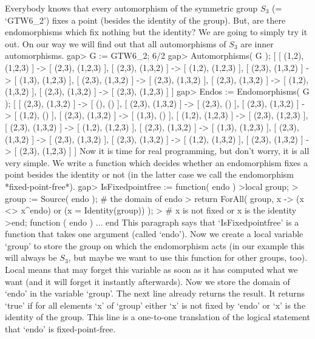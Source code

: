         Everybody knows that every automorphism of the symmetric group $S_3$
        (= `GTW6_2') fixes a point (besides the identity of the group). But,
        are there endomorphisms which fix nothing but the identity? We are
        going to simply try it out. On our way we will find out that all
        automorphisms of $S_3$ are inner automorphisms.
\beginexample
    gap> G := GTW6_2;
    6/2
    gap> Automorphisms( G );
    [ [ (1,2), (1,2,3) ] -> [ (2,3), (1,2,3) ], 
      [ (2,3), (1,3,2) ] -> [ (1,2), (1,2,3) ], 
      [ (2,3), (1,3,2) ] -> [ (1,3), (1,2,3) ], 
      [ (2,3), (1,3,2) ] -> [ (2,3), (1,3,2) ], 
      [ (2,3), (1,3,2) ] -> [ (1,2), (1,3,2) ], 
      [ (2,3), (1,3,2) ] -> [ (2,3), (1,2,3) ] ]
    gap> Endos := Endomorphisms( G );
    [ [ (2,3), (1,3,2) ] -> [ (), () ], [ (2,3), (1,3,2) ] -> [ (2,3), () ],
      [ (2,3), (1,3,2) ] -> [ (1,2), () ], 
      [ (2,3), (1,3,2) ] -> [ (1,3), () ], 
      [ (1,2), (1,2,3) ] -> [ (2,3), (1,2,3) ], 
      [ (2,3), (1,3,2) ] -> [ (1,2), (1,2,3) ], 
      [ (2,3), (1,3,2) ] -> [ (1,3), (1,2,3) ], 
      [ (2,3), (1,3,2) ] -> [ (2,3), (1,3,2) ], 
      [ (2,3), (1,3,2) ] -> [ (1,2), (1,3,2) ], 
      [ (2,3), (1,3,2) ] -> [ (2,3), (1,2,3) ] ]
\endexample
        Now it is time for real programming, but don't worry, it is all very
        simple. We write a function which decides whether an endomorphism
        fixes a point besides the identity or not (in the latter case we
        call the endomorphism *fixed-point-free*).
\beginexample
    gap> IsFixedpointfree := function( endo )
    >local group;
    >  group := Source( endo ); # the domain of endo
    >  return ForAll( group, x -> (x <> x^endo) or (x = Identity(group)) );
    >  #                           x is not fixed or x is the identity
    >end;
    function ( endo ) ... end
\endexample
        This paragraph says that `IsFixedpointfree' is a function that takes
        one argument (called `endo'). Now we create a local variable `group' to
        store the group on which the endomorphism acts (in our example this
        will always be $S_3$, but maybe we want to use this function for
        other groups, too). Local means that {\GAP} may forget this variable
        as soon as it has computed what we want (and it will forget it
        instantly afterwards). Now we store the domain of `endo' in the
        variable `group'. The next line already returns the result. It returns
        `true' if for all elements `x' of `group' either `x' is not fixed
        by `endo' or `x' is the identity of the group. This line is a
        one-to-one translation of the logical statement that `endo' is
        fixed-point-free.

